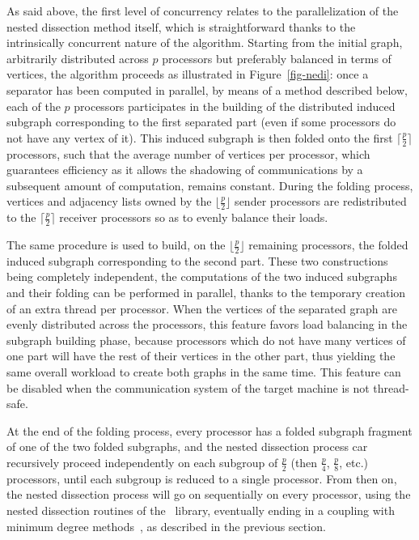 As said above, the first level of concurrency relates to the
parallelization of the nested dissection method itself, which is
straightforward thanks to the intrinsically concurrent nature of the
algorithm. Starting from the initial graph, arbitrarily distributed
across $p$ processors but preferably balanced in terms of vertices,
the algorithm proceeds as illustrated in Figure~\ref{fig-nedi}: once
a separator has been computed in parallel, by means of a method described
below, each of the $p$ processors participates in the building of the
distributed induced subgraph corresponding to the first separated part
(even if some processors do not have any vertex of it). This induced
subgraph is then folded onto the first $\lceil\frac{p}{2}\rceil$
processors, such that the average number of vertices per processor,
which guarantees efficiency as it allows the shadowing of
communications by a subsequent amount of computation, remains
constant. During the folding process, vertices and adjacency lists
owned by the $\lfloor\frac{p}{2}\rfloor$ sender processors are
redistributed to the $\lceil\frac{p}{2}\rceil$ receiver processors so
as to evenly balance their loads.

The same procedure is used to build, on the
$\lfloor\frac{p}{2}\rfloor$ remaining processors, the folded induced
subgraph corresponding to the second part. These two constructions
being completely independent, the computations of the two induced
subgraphs and their folding can be performed in parallel, thanks to the
temporary creation of an extra thread per processor. When the vertices
of the separated graph are evenly distributed across the processors,
this feature favors load balancing in the subgraph building phase,
because processors which do not have many vertices of one part will
have the rest of their vertices in the other part, thus yielding the
same overall workload to create both graphs in the same time. This
feature can be disabled when the communication system of the target
machine is not thread-safe.

At the end of the folding process, every processor has a folded
subgraph fragment of one of the two folded subgraphs, and the nested
dissection process car recursively proceed independently on each
subgroup of $\frac{p}{2}$ (then $\frac{p}{4}$, $\frac{p}{8}$,
etc\@.) processors, until each subgroup is reduced to a single
processor. From then on, the nested dissection process will go on
sequentially on every processor, using the nested dissection routines
of the \scotch\ library, eventually ending in a coupling with minimum
degree methods~\cite{peroam00a}, as described in the previous section.

